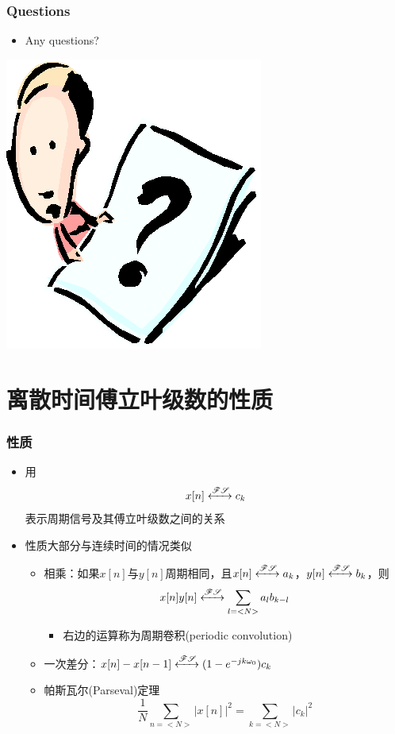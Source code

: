 \documentclass[CJKutf8,xcolor=pdftex,dvipsnames,table]{beamer}
\begin{document}
\begin{CJK*}{UTF8}{song}
  \begin{frame}
    \frametitle{Questions}
    \begin{itemize}
    \item Any questions?
    \end{itemize}
    \begin{center}
      \includegraphics[scale=.5]{question}
    \end{center}
  \end{frame}  
  
  \section{离散时间傅立叶级数的性质}  
  
  \begin{frame}
    \frametitle{性质}
    \begin{itemize}
    \item 用
    \[ x[n] \xleftrightarrow{\mathscr{FS}} c_k \]
    表示周期信号及其傅立叶级数之间的关系    
    \item 性质大部分与连续时间的情况类似
    	\begin{itemize}
		\item 相乘：如果$x[n]$与$y[n]$周期相同，且$x[n] \xleftrightarrow{\mathscr{FS}} a_k$，$y[n] \xleftrightarrow{\mathscr{FS}} b_k$，则\[x[n]y[n] \xleftrightarrow{\mathscr{FS}} \sum_{l=<N>}a_l b_{k-l}\]
			\begin{itemize}
			\item 右边的运算称为周期卷积(periodic convolution)
			\end{itemize}
    	\item 一次差分：$x[n] - x[n-1] \xleftrightarrow{\mathscr{FS}} (1-e^{-jk\omega_0}) c_k $
		\item 帕斯瓦尔(Parseval)定理\[ \frac{1}{N}\sum_{n=<N>}|x[n]|^2 = \sum_{k=<N>} |c_k|^2 \]
    	\end{itemize}
	\end{itemize}
  \end{frame}    
      

\end{CJK*}
\end{document}
